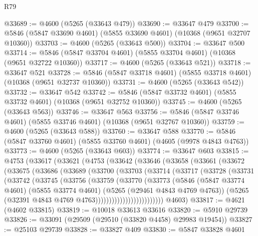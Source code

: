 \begin{lexlean}{R79}
\begin{coremodule}
@33689 := @4600 (@5265 (@33643 @479))
@33690 := @33647 @479
@33700 := @5846 (@5847 @33690 @4601) (@5855 @33690 @4601) (@10368 (@9651 @32707 @10360))
@33703 := @4600 (@5265 (@33643 @500))
@33704 := @33647 @500
@33714 := @5846 (@5847 @33704 @4601) (@5855 @33704 @4601) (@10368 (@9651 @32722 @10360))
@33717 := @4600 (@5265 (@33643 @521))
@33718 := @33647 @521
@33728 := @5846 (@5847 @33718 @4601) (@5855 @33718 @4601) (@10368 (@9651 @32737 @10360))
@33731 := @4600 (@5265 (@33643 @542))
@33732 := @33647 @542
@33742 := @5846 (@5847 @33732 @4601) (@5855 @33732 @4601) (@10368 (@9651 @32752 @10360))
@33745 := @4600 (@5265 (@33643 @563))
@33746 := @33647 @563
@33756 := @5846 (@5847 @33746 @4601) (@5855 @33746 @4601) (@10368 (@9651 @32767 @10360))
@33759 := @4600 (@5265 (@33643 @588))
@33760 := @33647 @588
@33770 := @5846 (@5847 @33760 @4601) (@5855 @33760 @4601) (@4605 (@9978 @4843 @4763))
@33773 := @4600 (@5265 (@33643 @603))
@33774 := @33647 @603
@33815 := @4753
    (@33617
      (@33621
        (@4753
          (@33642
            (@33646
              (@33658
                (@33661
                  (@33672
                    (@33675
                      (@33686
                        (@33689
                          (@33700
                            (@33703
                              (@33714
                                (@33717
                                  (@33728
                                    (@33731
                                      (@33742
                                        (@33745
                                          (@33756
                                            (@33759
                                              (@33770
                                                (@33773
                                                  (@5846
                                                    (@5847 @33774 @4601)
                                                    (@5855 @33774 @4601)
                                                    (@5265 (@29461 @4843 @4769 @4763))
                                                    (@5265
                                                      (@32391
                                                        @4843
                                                        @4769
                                                        @4763)))))))))))))))))))))))))
      @4603)
@33817 := @4621 (@4602 @33815)
@33819 := @10018 @33613 @33616
@33820 := @5910 @29739
@33826 := @33091 (@29509 (@29510 (@33820 @4458) @29983 @19454))
@33827 := @25103 @29739
@33828 := @33827 @409
@33830 := @5847 @33828 @4601

\end{coremodule}
\end{lexlean}
